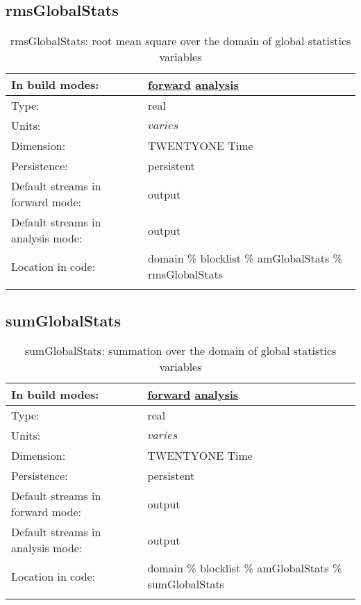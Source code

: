 \subsection[rmsGlobalStats]{rmsGlobalStats}
\label{subsec:var_sec_amGlobalStats_rmsGlobalStats}
\begin{center}
\begin{longtable}{| p{2.0in} | p{4.0in} |}
        \hline 
        In build modes: & \hyperref[subsec:forward_var_tab_amGlobalStats]{forward} \hyperref[subsec:analysis_var_tab_amGlobalStats]{analysis} \\
        \hline 
        Type: & real \\
        \hline 
        Units: & $varies$ \\
        \hline 
        Dimension: & TWENTYONE Time \\
        \hline 
        Persistence: & persistent \\
        \hline 
		 Default streams in forward mode: &  output \\
        \hline 
		 Default streams in analysis mode: &  output \\
        \hline 
		 Location in code: & domain \% blocklist \% amGlobalStats \% rmsGlobalStats \\
		 \hline 
    \caption{rmsGlobalStats: root mean square over the domain of global statistics variables}
\end{longtable}
\end{center}
\subsection[sumGlobalStats]{sumGlobalStats}
\label{subsec:var_sec_amGlobalStats_sumGlobalStats}
\begin{center}
\begin{longtable}{| p{2.0in} | p{4.0in} |}
        \hline 
        In build modes: & \hyperref[subsec:forward_var_tab_amGlobalStats]{forward} \hyperref[subsec:analysis_var_tab_amGlobalStats]{analysis} \\
        \hline 
        Type: & real \\
        \hline 
        Units: & $varies$ \\
        \hline 
        Dimension: & TWENTYONE Time \\
        \hline 
        Persistence: & persistent \\
        \hline 
		 Default streams in forward mode: &  output \\
        \hline 
		 Default streams in analysis mode: &  output \\
        \hline 
		 Location in code: & domain \% blocklist \% amGlobalStats \% sumGlobalStats \\
		 \hline 
    \caption{sumGlobalStats: summation over the domain of global statistics variables}
\end{longtable}
\end{center}

